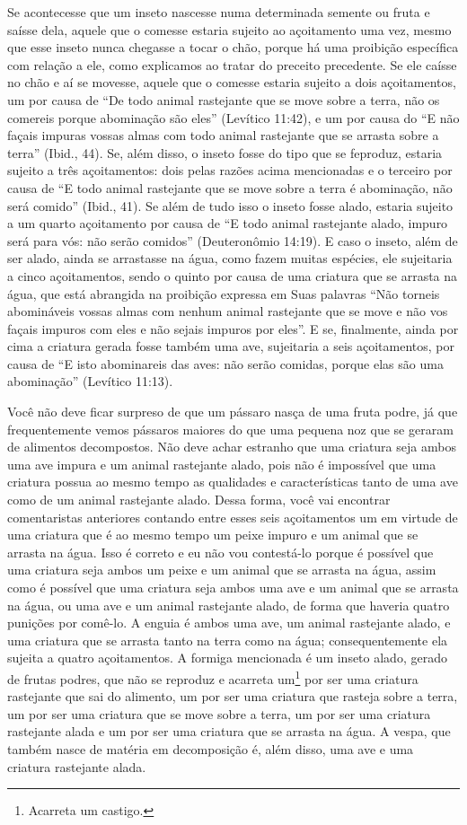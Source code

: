 Se acontecesse que um inseto nascesse numa determinada semente ou fruta
e saísse dela, aquele que o comesse estaria sujeito ao açoitamento uma
vez, mesmo que esse inseto nunca chegasse a tocar o chão, porque há uma
proibição específica com relação a ele, como explicamos ao tratar do
preceito precedente. Se ele caísse no chão e aí se movesse, aquele que
o comesse estaria sujeito a dois açoitamentos, um por causa de ``De todo
animal rastejante que se move sobre a terra, não os comereis porque
abominação são eles'' (Levítico 11:42), e um por causa do ``E não façais
impuras vossas almas com todo animal rastejante que se arrasta sobre a
terra'' (Ibid., 44). Se, além disso, o inseto fosse do tipo que se
feproduz, estaria sujeito a três açoitamentos: dois pelas razões acima
mencionadas e o terceiro por causa de ``E todo animal rastejante que se
move sobre a terra é abominação, não será comido'' (Ibid., 41). Se além
de tudo isso o inseto fosse alado, estaria sujeito a um quarto
açoitamento por causa de ``E todo animal rastejante alado, impuro será
para vós: não serão comidos'' (Deuteronômio 14:19). E caso o inseto,
além de ser alado, ainda se arrastasse na água, como fazem muitas
espécies, ele sujeitaria a cinco açoitamentos, sendo o quinto por causa
de uma criatura que se arrasta na água, que está abrangida na proibição
expressa em Suas palavras ``Não torneis abomináveis vossas almas com
nenhum animal rastejante que se move e não vos façais impuros com eles e
não sejais impuros por eles''. E se, finalmente, ainda por cima a
criatura gerada fosse também uma ave, sujeitaria a seis açoitamentos,
por causa de ``E isto abominareis das aves: não serão comidas, porque
elas são uma abominação'' (Levítico 11:13).

Você não deve ficar surpreso de que um pássaro nasça de uma fruta podre,
já que frequentemente vemos pássaros maiores do que uma pequena noz que
se geraram de alimentos decompostos. Não deve achar estranho que uma
criatura seja ambos uma ave impura e um animal rastejante alado, pois
não é impossível que uma criatura possua ao mesmo tempo as qualidades e
características tanto de uma ave como de um animal rastejante alado.
Dessa forma, você vai encontrar comentaristas anteriores contando entre
esses seis açoitamentos um em virtude de uma criatura que é ao mesmo
tempo um peixe impuro e um animal que se arrasta na água. Isso é
correto e eu não vou contestá-lo porque é possível que uma criatura seja
ambos um peixe e um animal que se arrasta na água, assim como é possível
que uma criatura seja ambos uma ave e um animal que se arrasta na água,
ou uma ave e um animal rastejante alado, de forma que haveria quatro
punições por comê-lo. A enguia é ambos uma ave, um animal rastejante
alado, e uma criatura que se arrasta tanto na terra como na água;
consequentemente ela sujeita a quatro açoitamentos. A formiga
mencionada é um inseto alado, gerado de frutas podres, que não se
reproduz e acarreta um\footnote{Acarreta um castigo.} por ser uma criatura
rastejante que sai do alimento, um por ser uma criatura que rasteja
sobre a terra, um por ser uma criatura que se move sobre a terra, um por
ser uma criatura rastejante alada e um por ser uma criatura que se
arrasta na água. A vespa, que também nasce de matéria em decomposição é,
além disso, uma ave e uma criatura rastejante alada.

